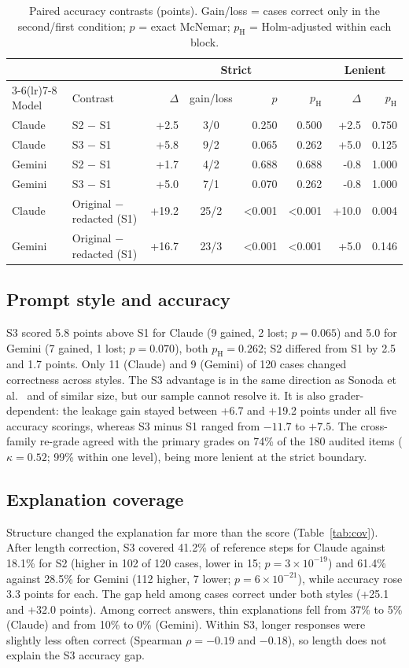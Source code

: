 \IfFileExists{IEEEtran.cls}{\ieeetrue\documentclass[conference]{IEEEtran}}{\ieeefalse\documentclass[10pt,twocolumn,letterpaper]{article}}
\begin{document}
\begin{table}[t]
\centering\caption{Paired accuracy contrasts (points). Gain/loss = cases correct only in the second/first condition; $p$ = exact McNemar; $p_{\mathrm{H}}$ = Holm-adjusted within each block.}\label{tab:con}
\footnotesize
\begin{tabular}{@{}llrcrrrr@{}}
\toprule
 & & \multicolumn{4}{c}{Strict} & \multicolumn{2}{c}{Lenient}\\
\cmidrule(lr){3-6}\cmidrule(lr){7-8}
Model & Contrast & $\Delta$ & gain/loss & $p$ & $p_{\mathrm{H}}$ & $\Delta$ & $p_{\mathrm{H}}$\\
\midrule
Claude & S2 $-$ S1 & +2.5 & 3/0 & 0.250 & 0.500 & +2.5 & 0.750\\
Claude & S3 $-$ S1 & +5.8 & 9/2 & 0.065 & 0.262 & +5.0 & 0.125\\
Gemini & S2 $-$ S1 & +1.7 & 4/2 & 0.688 & 0.688 & -0.8 & 1.000\\
Gemini & S3 $-$ S1 & +5.0 & 7/1 & 0.070 & 0.262 & -0.8 & 1.000\\
\midrule
Claude & Original $-$ redacted (S1) & +19.2 & 25/2 & <0.001 & <0.001 & +10.0 & 0.004\\
Gemini & Original $-$ redacted (S1) & +16.7 & 23/3 & <0.001 & <0.001 & +5.0 & 0.146\\
\bottomrule
\end{tabular}
\end{table}

\subsection{Prompt style and accuracy}
S3 scored 5.8 points above S1 for Claude (9 gained, 2 lost; $p=0.065$) and 5.0 for Gemini (7 gained, 1 lost; $p=0.070$), both $p_{\mathrm{H}}=0.262$; S2 differed from S1 by 2.5 and 1.7 points. Only 11 (Claude) and 9 (Gemini) of 120 cases changed correctness across styles. The S3 advantage is in the same direction as Sonoda et al.\ \cite{sonoda2025} and of similar size, but our sample cannot resolve it. It is also grader-dependent: the leakage gain stayed between +6.7 and +19.2 points under all five accuracy scorings, whereas S3 minus S1 ranged from $-11.7$ to $+7.5$. The cross-family re-grade agreed with the primary grades on 74\% of the 180 audited items ($\kappa=0.52$; 99\% within one level), being more lenient at the strict boundary.

\subsection{Explanation coverage}
Structure changed the explanation far more than the score (Table~\ref{tab:cov}). After length correction, S3 covered 41.2\% of reference steps for Claude against 18.1\% for S2 (higher in 102 of 120 cases, lower in 15; $p=3\times10^{-19}$) and 61.4\% against 28.5\% for Gemini (112 higher, 7 lower; $p=6\times10^{-21}$), while accuracy rose 3.3 points for each. The gap held among cases correct under both styles (+25.1 and +32.0 points). Among correct answers, thin explanations fell from 37\% to 5\% (Claude) and from 10\% to 0\% (Gemini). Within S3, longer responses were slightly less often correct (Spearman $\rho=-0.19$ and $-0.18$), so length does not explain the S3 accuracy gap.
\end{document}
